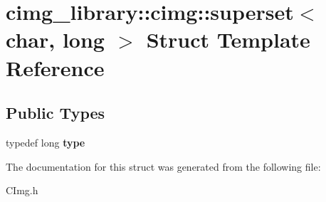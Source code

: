 \hypertarget{structcimg__library_1_1cimg_1_1superset_3_01char_00_01long_01_4}{\section{cimg\-\_\-library\-:\-:cimg\-:\-:superset$<$ char, long $>$ Struct Template Reference}
\label{structcimg__library_1_1cimg_1_1superset_3_01char_00_01long_01_4}
}
\subsection*{Public Types}
\begin{DoxyCompactItemize}
\item 
\hypertarget{structcimg__library_1_1cimg_1_1superset_3_01char_00_01long_01_4_a24de6e4e9eefbe28699c533375d85e83}{typedef long {\bfseries type}}\label{structcimg__library_1_1cimg_1_1superset_3_01char_00_01long_01_4_a24de6e4e9eefbe28699c533375d85e83}

\end{DoxyCompactItemize}


The documentation for this struct was generated from the following file\-:\begin{DoxyCompactItemize}
\item 
C\-Img.\-h\end{DoxyCompactItemize}
